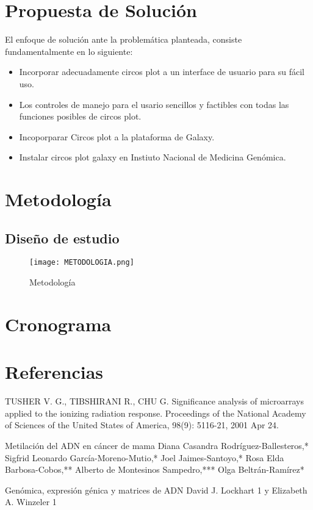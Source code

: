 \documentclass[12pt,letterpaper]{article}
\begin{document}
\section{Propuesta de Solución}
El enfoque de solución ante la problemática planteada, consiste fundamentalmente en lo siguiente:
\begin{itemize}
\item Incorporar adecuadamente circos plot a un interface de usuario para su fácil uso.
\item Los controles de manejo para el usario sencillos y factibles con todas  las funciones posibles de circos plot.
\item Incoporparar Circos plot a la plataforma de Galaxy.
\item Instalar circos plot galaxy en Instiuto Nacional de Medicina Genómica.
\end{itemize}

\section{Metodología}
\subsection{Diseño de estudio}

\begin{figure}[H]
\begin{center}
\texttt{[image: METODOLOGIA.png]}
\end{center}
\caption{Metodología}
\end{figure}

\section{Cronograma}
\section{Referencias}
TUSHER V. G., TIBSHIRANI R., CHU G. Significance analysis of microarrays applied
to the ionizing radiation response. Proceedings of the National Academy of Sciences of
the United States of America, 98(9): 5116-21, 2001 Apr 24.

Metilación del ADN en cáncer de mama
Diana Casandra Rodríguez-Ballesteros,*
Sigfrid Leonardo García-Moreno-Mutio,* Joel Jaimes-Santoyo,* Rosa Elda Barbosa-Cobos,**
Alberto de Montesinos Sampedro,*** Olga Beltrán-Ramírez*

Genómica, expresión génica y matrices de ADN
David J. Lockhart 1 y Elizabeth A. Winzeler 1

\end{document}
